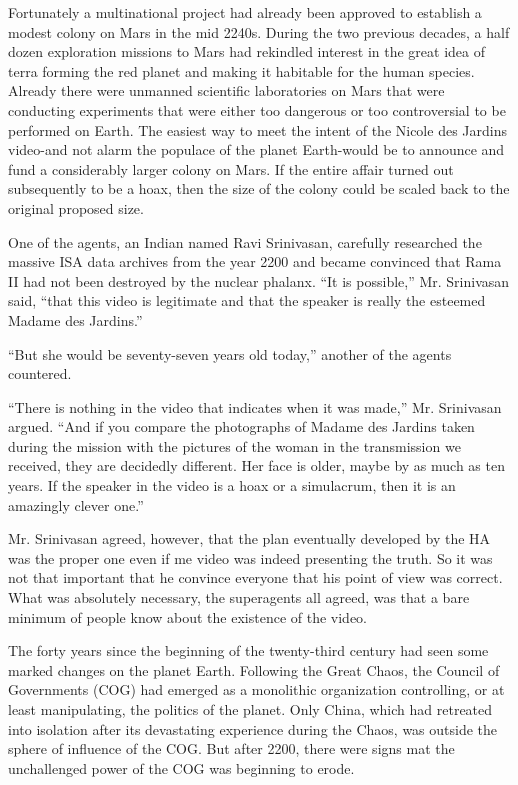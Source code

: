 \documentclass[]{article}
\begin{document}
{Fortunately a multinational project had already been approved to establish a modest colony on Mars in the mid 2240s.  During the two previous decades, a half dozen exploration missions to Mars had rekindled interest in the great idea of terra forming the red planet and making it habitable for the human species.  Already there were unmanned scientific laboratories on Mars that were conducting experiments that were either too dangerous or too controversial to be performed on Earth.  The easiest way to meet the intent of the Nicole des Jardins video-and not alarm the populace of the planet Earth-would be to announce and fund a considerably larger colony on Mars.  If the entire affair turned out subsequently to be a hoax, then the size of the colony could be scaled back to the original proposed size.

One of the agents, an Indian named Ravi Srinivasan, carefully researched the massive ISA data archives from the year 2200 and became convinced that Rama II had not been destroyed by the nuclear phalanx.  “It is possible,” Mr.  Srinivasan said, “that this video is legitimate and that the speaker is really the esteemed Madame des Jardins.”

“But she would be seventy-seven years old today,” another of the agents countered.

“There is nothing in the video that indicates when it was made,” Mr.  Srinivasan argued.  “And if you compare the photographs of Madame des Jardins taken during the mission with the pictures of the woman in the transmission we received, they are decidedly different.  Her face is older, maybe by as much as ten years.  If the speaker in the video is a hoax or a simulacrum, then it is an amazingly clever one.”

Mr.  Srinivasan agreed, however, that the plan eventually developed by the HA was the proper one even if me video was indeed presenting the truth.  So it was not that important that he convince everyone that his point of view was correct.  What was absolutely necessary, the superagents all agreed, was that a bare minimum of people know about the existence of the video.

The forty years since the beginning of the twenty-third century had seen some marked changes on the planet Earth.  Following the Great Chaos, the Council of Governments (COG) had emerged as a monolithic organization controlling, or at least manipulating, the politics of the planet.  Only China, which had retreated into isolation after its devastating experience during the Chaos, was outside the sphere of influence of the COG.  But after 2200, there were signs mat the unchallenged power of the COG was beginning to erode.

}
\end{document}
